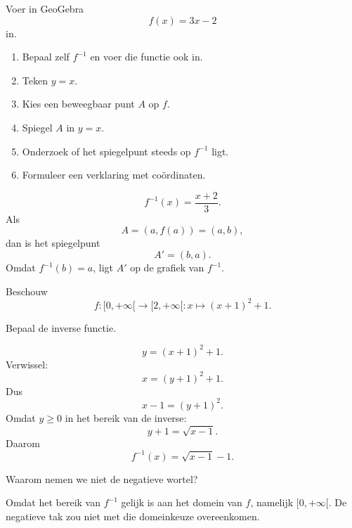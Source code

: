 \documentclass{ximera}
\begin{document}
\begin{oefening}{\oefU\ESS}

Voer in GeoGebra
\[
f(x)=3x-2
\]
in.

\begin{enumerate}
    \item Bepaal zelf \(f^{-1}\) en voer die functie ook in.
    \item Teken \(y=x\).
    \item Kies een beweegbaar punt \(A\) op \(f\).
    \item Spiegel \(A\) in \(y=x\).
    \item Onderzoek of het spiegelpunt steeds op \(f^{-1}\) ligt.
    \item Formuleer een verklaring met coördinaten.
\end{enumerate}

\begin{oplossing}
\[
f^{-1}(x)=\frac{x+2}{3}.
\]
Als
\[
A=(a,f(a))=(a,b),
\]
dan is het spiegelpunt
\[
A'=(b,a).
\]
Omdat \(f^{-1}(b)=a\), ligt \(A'\) op de grafiek van \(f^{-1}\).
\end{oplossing}

\end{oefening}

\begin{oefening}{\oefU\ESS}

Beschouw
\[
f:[0,+\infty[\to[2,+\infty[:x\mapsto (x+1)^2+1.
\]

\begin{question}
Bepaal de inverse functie.

\begin{oplossing}
\[
y=(x+1)^2+1.
\]
Verwissel:
\[
x=(y+1)^2+1.
\]
Dus
\[
x-1=(y+1)^2.
\]
Omdat \(y\geq0\) in het bereik van de inverse:
\[
y+1=\sqrt{x-1}.
\]
Daarom
\[
\boxed{f^{-1}(x)=\sqrt{x-1}-1.}
\]
\end{oplossing}
\end{question}

\begin{question}
Waarom nemen we niet de negatieve wortel?

\begin{oplossing}
Omdat het bereik van \(f^{-1}\) gelijk is aan het domein van \(f\),
namelijk \([0,+\infty[\). De negatieve tak zou niet met die domeinkeuze
overeenkomen.
\end{oplossing}
\end{question}

\end{oefening}
\end{document}
